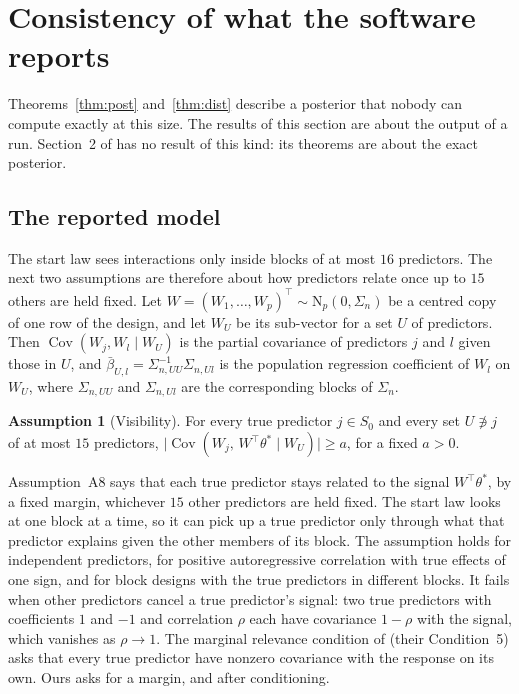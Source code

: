 \documentclass[11pt]{article}
\newcommand{\N}{\mathrm{N}}
\newcommand{\abs}[1]{\lvert #1\rvert}
\newcommand{\Cov}{\operatorname{Cov}}
\newcommand{\tstar}{\theta^*}
\newcommand{\Sz}{S_0}
\newcommand{\Sig}{\Sigma_n}
\theoremstyle{plain}
\theoremstyle{definition}
\newtheorem{asm}{Assumption}
\begin{document}
\section{Consistency of what the software reports}\label{sec:software}

Theorems~\ref{thm:post} and~\ref{thm:dist} describe a posterior that nobody can compute exactly at this size. The
results of this section are about the output of a run. Section~2 of \citet{SongLiang2015} has no result of this kind:
its theorems are about the exact posterior.

\subsection{The reported model}\label{sec:reported}

The start law sees interactions only inside blocks of at most $16$ predictors. The next two assumptions are therefore
about how predictors relate once up to $15$ others are held fixed. Let $W=(W_1,\dots,W_p)^\top\sim\N_p(0,\Sig)$ be a
centred copy of one row of the design, and let $W_U$ be its sub-vector for a set $U$ of predictors. Then
$\Cov(W_j,W_l\mid W_U)$ is the partial covariance of predictors $j$ and $l$ given those in $U$, and
$\bar\beta_{U,l}=\Sigma_{n,UU}^{-1}\Sigma_{n,Ul}$ is the population regression coefficient of $W_l$ on $W_U$, where
$\Sigma_{n,UU}$ and $\Sigma_{n,Ul}$ are the corresponding blocks of $\Sig$.

\begin{asm}[Visibility]\label{a:vis}
For every true predictor $j\in\Sz$ and every set $U\not\ni j$ of at most $15$ predictors,
$\abs{\Cov(W_j,\,W^\top\tstar\mid W_U)}\ge a$, for a fixed $a>0$.
\end{asm}

Assumption~A8 says that each true predictor stays related to the signal $W^\top\tstar$, by a fixed margin, whichever
$15$ other predictors are held fixed. The start law looks at one block at a time, so it can pick up a true predictor
only through what that predictor explains given the other members of its block. The assumption holds for independent
predictors, for positive autoregressive correlation with true effects of one sign, and for block designs with the true
predictors in different blocks. It fails when other predictors cancel a true predictor's signal: two true predictors
with coefficients $1$ and $-1$ and correlation $\rho$ each have covariance $1-\rho$ with the signal, which vanishes as
$\rho\to1$. The marginal relevance condition of \citet{SongLiang2015} (their Condition~5) asks that every true
predictor have nonzero covariance with the response on its own. Ours asks for a margin, and after conditioning.
\end{document}
